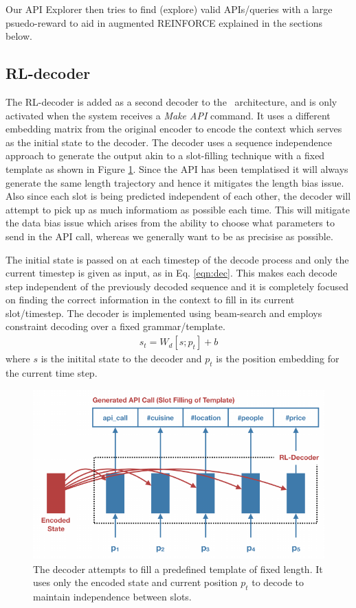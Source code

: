 Our API Explorer then tries to find (explore) valid APIs/queries with a large psuedo-reward to aid in augmented REINFORCE explained in the sections below.

\subsection{RL-decoder}
\label{ssec:rldecode}
The RL-decoder is added as a second decoder to the \sys\ architecture, and is only activated when the system receives a {\em Make API} command. It uses a different embedding matrix from the original encoder to encode the context which serves as the initial state to the decoder. The decoder uses a sequence independence approach to generate the output akin to a slot-filling technique with a fixed template as shown in Figure \ref{fig:rldec}. Since the API has been templatised it will always generate the same length trajectory and hence it mitigates the length bias issue. Also since each slot is being predicted independent of each other, the decoder will attempt to pick up as much informatiom as possible each time. This will mitigate the data bias issue which arises from the ability to choose what parameters to send in the API call, whereas we generally want to be as precisise as possible.

The initial state is passed on at each timestep of the decode process and only the current timestep is given as input, as in Eq. \ref{eqn:dec}. This makes each decode step independent of the previously decoded sequence and it is completely focused on finding the correct information in the context to fill in its current slot/timestep. The decoder is implemented using beam-search and employs constraint decoding over a fixed grammar/template.
\begin{eqnarray}
s_{t} = W_d [s;p_t] + b \label{eqn:dec}
\end{eqnarray}
where $s$ is the initital state to the decoder and $p_t$ is the position embedding for the current time step.

\begin{figure}[!t]
\centering
\includegraphics[scale=1.1]{assets/figures/rl_decoder.pdf}
\caption{The decoder attempts to fill a predefined template of fixed length. It uses only the encoded state and current position $p_t$ to decode to maintain independence between slots.}
\label{fig:rldec}
\end{figure}

